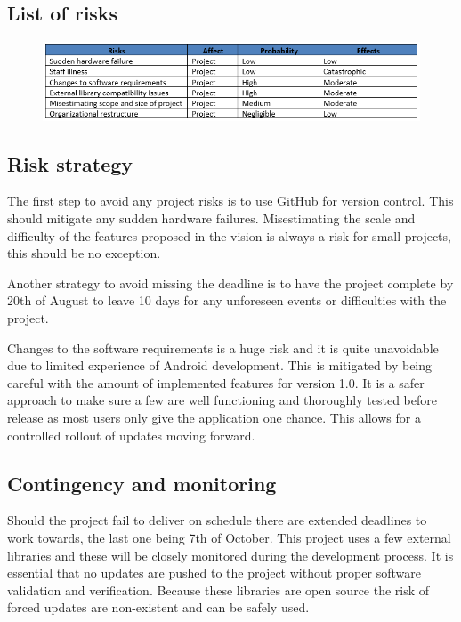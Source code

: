 \documentclass[]{article}
\begin{document}
\begin{flushleft}
\subsection{List of risks}

\begin{figure}[H]
\includegraphics[scale=0.8]{risks.png}
\end{figure}


\subsection{Risk strategy}
The first step to avoid any project risks is to use GitHub for version control. This should mitigate any sudden hardware failures. Misestimating the scale and difficulty of the features proposed in the vision is always a risk for small projects, this should be no exception.\medskip 

Another strategy to avoid missing the deadline is to have the project complete by 20th of August to leave 10 days for any unforeseen events or difficulties with the project.\medskip

Changes to the software requirements is a huge risk and it is quite unavoidable due to limited experience of Android development. This is mitigated by being careful with the amount of implemented features for version 1.0. It is a safer approach to make sure a few are well functioning and thoroughly tested before release as most users only give the application one chance. This allows for a controlled rollout of updates moving forward.

\subsection{Contingency and monitoring}
Should the project fail to deliver on schedule there are extended deadlines to work towards, the last one being 7th of October. This project uses a few external libraries and these will be closely monitored during the development process. It is essential that no updates are pushed to the project without proper software validation and verification. Because these libraries are open source the risk of forced updates are non-existent and can be safely used.
\newpage

\end{flushleft}
\end{document}
